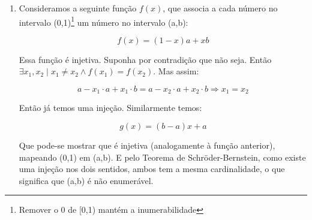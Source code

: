 \documentclass{article}
\begin{document}
\begin{enumerate}
    \item Consideramos a seguinte função \( f(x) \), que associa a cada número no intervalo (0,1)\footnote{Remover o 0 de [0,1) mantém a inumerabilidade} um número no intervalo (a,b):

                \[ f(x) = (1-x)a + xb \]

                Essa função é injetiva. Suponha por contradição que não seja. Então \( \exists x_1, x_2 \mid x_1 \neq x_2 \land f(x_1) = f(x_2) \). Mas assim: 

                \[ a - x_1 \cdot a + x_1 \cdot b = a - x_2 \cdot a + x_2 \cdot b \Rightarrow x_1 = x_2 \]

                Então já temos uma injeção. Similarmente temos:

                \[ g(x) = (b-a)x + a \]

                Que pode-se mostrar que é injetiva (analogamente à função anterior), mapeando (0,1) em (a,b). E pelo Teorema de Schröder-Bernstein, como existe uma injeção nos dois sentidos, ambos tem a mesma cardinalidade, o que significa que (a,b) é não enumerável.

\end{enumerate}
\end{document}
